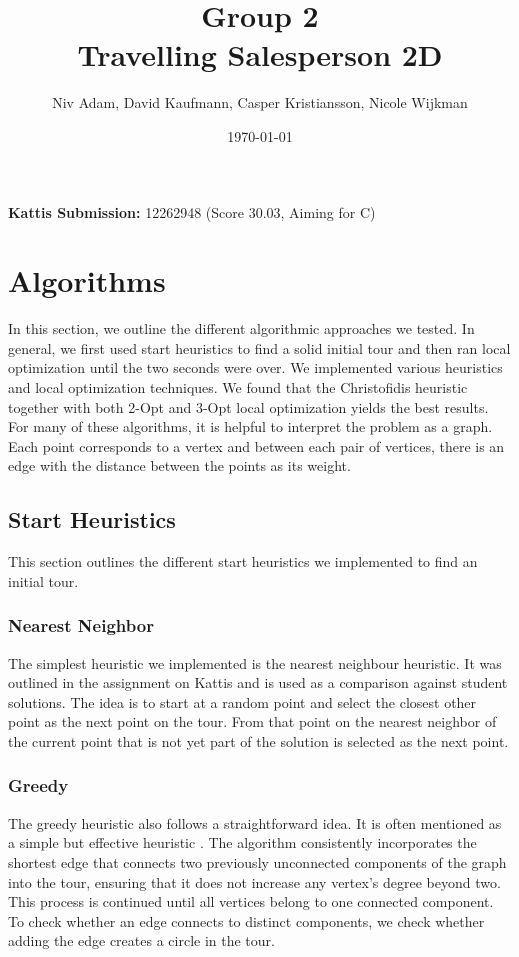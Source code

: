 \documentclass{article}
\title{Group 2\\Travelling Salesperson 2D}
\author{Niv Adam, David Kaufmann, Casper Kristiansson, Nicole Wijkman}
\date{\today}
\begin{document}
\maketitle
\setlength\parindent{0pt}   %
\setlength{\parskip}{\bigskipamount}    %

\textbf{Kattis Submission:} 12262948 (Score 30.03, Aiming for C)
\section{Algorithms}
In this section, we outline the different algorithmic approaches we tested. In general, we first used start heuristics to find a solid initial tour and then ran local optimization until the two seconds were over. We implemented various heuristics and local optimization techniques. We found that the Christofidis heuristic together with both 2-Opt and 3-Opt local optimization yields the best results. For many of these algorithms, it is helpful to interpret the problem as a graph. Each point corresponds to a vertex and between each pair of vertices, there is an edge with the distance between the points as its weight.

\subsection{Start Heuristics}\label{sec:start_heuristics}
This section outlines the different start heuristics we implemented to find an initial tour.
\subsubsection{Nearest Neighbor}
The simplest heuristic we implemented is the nearest neighbour heuristic. It was outlined in the assignment on Kattis and is used as a comparison against student solutions. The idea is to start at a random point and select the closest other point as the next point on the tour. From that point on the nearest neighbor of the current point that is not yet part of the solution is selected as the next point.

\subsubsection{Greedy} \label{sec:Greedy}
The greedy heuristic also follows a straightforward idea. It is often mentioned as a simple but effective heuristic \cite{lecture_notes}. The algorithm consistently incorporates the shortest edge that connects two previously unconnected components of the graph into the tour, ensuring that it does not increase any vertex's degree beyond two. This process is continued until all vertices belong to one connected component. To check whether an edge connects to distinct components, we check whether adding the edge creates a circle in the tour.
\end{document}
